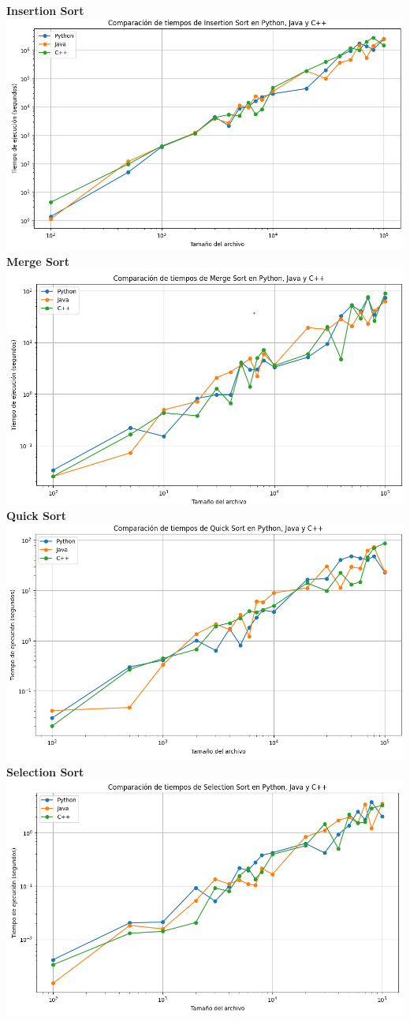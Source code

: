 \textbf{Insertion Sort}
\includegraphics[scale=.25]{img/graficos/por algoritmo/insertionsort.png}\\[0.2cm]
\textbf{Merge Sort}
\includegraphics[scale=.25]{img/graficos/por algoritmo/mergersort.png}\\[0.2cm]
\textbf{Quick Sort}
\includegraphics[scale=.25]{img/graficos/por algoritmo/quicksort.png}\\[0.2cm]
\textbf{Selection Sort}
\includegraphics[scale=.25]{img/graficos/por algoritmo/selectionsort.png}\\[0.2cm]